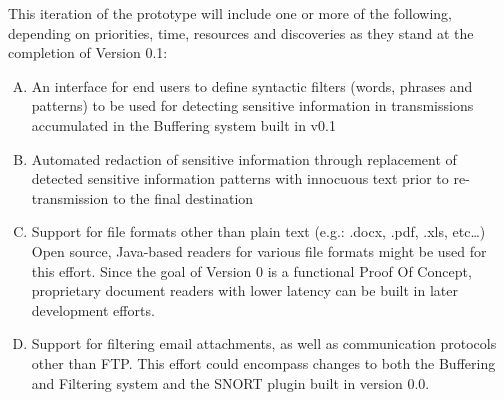 This iteration of the prototype will include one or more of the
following, depending on priorities, time, resources and discoveries as
they stand at the completion of Version 0.1:

\begin{enumerate}[A.]
\item An interface for end users to define syntactic filters (words,
phrases and patterns) to be used for detecting sensitive information
in transmissions accumulated in the Buffering system built in v0.1

\item Automated redaction of sensitive information through replacement of
detected sensitive information patterns with innocuous text prior to
re-transmission to the final destination

\item Support for file formats other than plain text (e.g.: .docx, .pdf,
.xls, etc…) Open source, Java-based readers for various file formats
might be used for this effort.  Since the goal of Version 0 is a
functional Proof Of Concept, proprietary document readers with lower
latency can be built in later development efforts.

\item Support for filtering email attachments, as well as communication
protocols other than FTP.  This effort could encompass changes to both
the Buffering and Filtering system and the SNORT plugin built in
version 0.0.
\end{enumerate}

